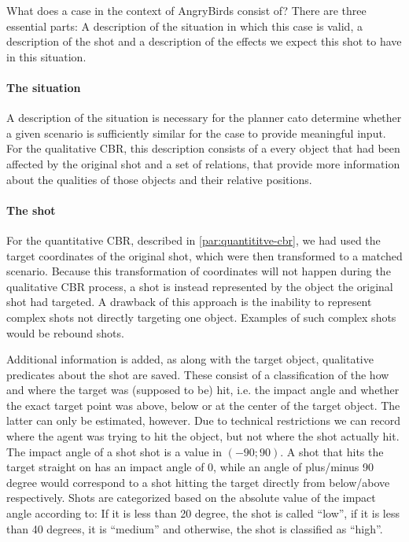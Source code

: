 What does a case in the context of AngryBirds consist of? There are three essential parts: A description of the situation in which this case is valid, a description of the shot and a description of the effects we expect this shot to have in this situation.

\paragraph{The situation}
A description of the situation is necessary for the planner cato determine whether a given scenario is sufficiently similar for the case to provide meaningful input.
For the qualitative CBR, this description consists of a every object that had been affected by the original shot and a set of relations, that provide more information about the qualities of those objects and their relative positions.


\paragraph{The shot}
For the quantitative CBR, described in \ref{par:quantititve-cbr}, we had used the target coordinates of the original shot, which were then transformed to a matched scenario.
Because this transformation of coordinates will not happen during the qualitative CBR process, a shot is instead represented by the object the original shot had targeted.
A drawback of this approach is the inability to represent complex shots not directly targeting one object.
Examples of such complex shots would be rebound shots.

Additional information is added, as along with the target object, qualitative predicates about the shot are saved. These consist of a classification of the how and where the target was (supposed to be) hit, i.e. the impact angle and whether the exact target point was above, below or at the center of the target object.
The latter can only be estimated, however. Due to technical restrictions we can record where the agent was trying to hit the object, but not where the shot actually hit.
The impact angle of a shot shot is a value in $(-90;90)$. A shot that hits the target straight on has an impact angle of 0, while an angle of plus/minus 90 degree would correspond to a shot hitting the target directly from below/above respectively. Shots are categorized based on the absolute value of the impact angle according to: If it is less than 20 degree, the shot is called ``low'', if it is less than 40 degrees, it is ``medium'' and otherwise, the shot is classified as ``high''.

